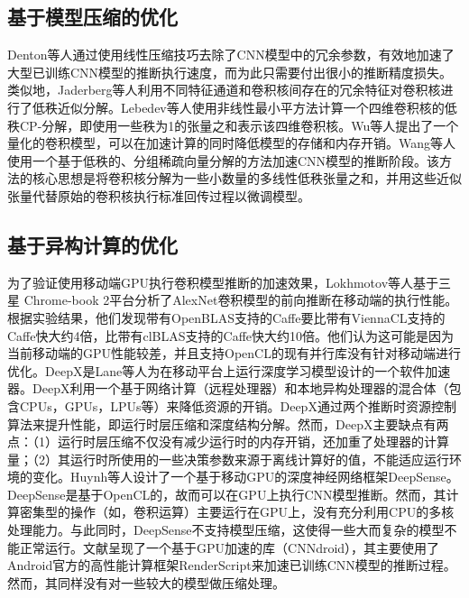 \subsection{基于模型压缩的优化}
Denton等人\cite{denton2014exploiting}通过使用线性压缩技巧去除了CNN模型中的冗余参数，有效地加速了大型已训练CNN模型的推断执行速度，而为此只需要付出很小的推断精度损失。类似地，Jaderberg等人\cite{jaderberg2014speeding}利用不同特征通道和卷积核间存在的冗余特征对卷积核进行了低秩近似分解。Lebedev等人\cite{lebedev2014speeding}使用非线性最小平方法计算一个四维卷积核的低秩CP-分解，即使用一些秩为1的张量之和表示该四维卷积核。Wu等人\cite{wu2016quantized}提出了一个量化的卷积模型，可以在加速计算的同时降低模型的存储和内存开销。Wang等人\cite{wang2016accelerating}使用一个基于低秩的、分组稀疏向量分解的方法加速CNN模型的推断阶段。该方法的核心思想是将卷积核分解为一些小数量的多线性低秩张量之和，并用这些近似张量代替原始的卷积核执行标准回传过程以微调模型。
\subsection{基于异构计算的优化}
为了验证使用移动端GPU执行卷积模型推断的加速效果，Lokhmotov等人\cite{lokhmotov2016optimizing}基于三星 Chrome-book 2平台分析了AlexNet\cite{krizhevsky2012imagenet}卷积模型的前向推断在移动端的执行性能。根据实验结果，他们发现带有OpenBLAS\cite{xianyi2012openblas}支持的Caffe\cite{jia2014caffe}要比带有ViennaCL\cite{rupp2010viennacl}支持的Caffe快大约4倍，比带有clBLAS\cite{nugteren2017clblast}支持的Caffe快大约10倍。他们认为这可能是因为当前移动端的GPU性能较差，并且支持OpenCL\cite{stone2010opencl}的现有并行库没有针对移动端进行优化。DeepX是Lane等人\cite{lane2016deepx}为在移动平台上运行深度学习模型设计的一个软件加速器。DeepX利用一个基于网络计算（远程处理器）和本地异构处理器的混合体（包含CPUs，GPUs，LPUs等）来降低资源的开销。DeepX通过两个推断时资源控制算法来提升性能，即运行时层压缩和深度结构分解。然而，DeepX主要缺点有两点：（1）运行时层压缩不仅没有减少运行时的内存开销，还加重了处理器的计算量；（2）其运行时所使用的一些决策参数来源于离线计算好的值，不能适应运行环境的变化。Huynh等人\cite{huynh2016deepsense}设计了一个基于移动GPU的深度神经网络框架DeepSense。DeepSense是基于OpenCL的，故而可以在GPU上执行CNN模型推断。然而，其计算密集型的操作（如，卷积运算）主要运行在GPU上，没有充分利用CPU的多核处理能力。与此同时，DeepSense不支持模型压缩，这使得一些大而复杂的模型不能正常运行。文献\cite{latifi2016cnndroid}呈现了一个基于GPU加速的库（CNNdroid），其主要使用了Android官方的高性能计算框架RenderScript\cite{guihot2012renderscript}来加速已训练CNN模型的推断过程。然而，其同样没有对一些较大的模型做压缩处理。
